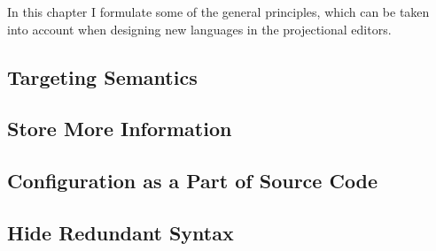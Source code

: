 







In this chapter I formulate some of the general principles, which can be taken into
account when designing new languages in the projectional editors.

\subsection{Targeting Semantics}

\subsection{Store More Information}


\subsection{Configuration as a Part of Source Code}

\subsection{Hide Redundant Syntax}

